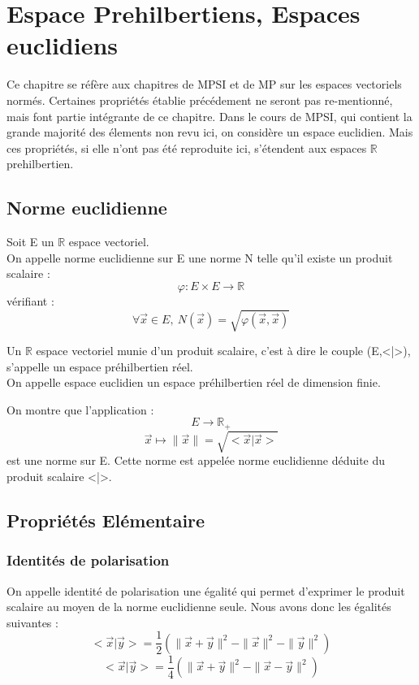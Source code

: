 \chapter{Espace Prehilbertiens, Espaces euclidiens}
Ce chapitre se réfère aux chapitres de MPSI et de MP sur les espaces vectoriels normés. Certaines propriétés établie précédement ne seront pas re-mentionné, mais font partie intégrante de ce chapitre. Dans le cours de MPSI, qui contient la grande majorité des élements non revu ici, on considère un espace euclidien. Mais ces propriétés, si elle n'ont pas été reproduite ici, s'étendent aux espaces $\mathbb{R}$ prehilbertien.
\section{Norme euclidienne}
\begin{de}
Soit E un $\mathbb{R}$ espace vectoriel.\\
On appelle norme euclidienne sur E une norme N telle qu'il existe un produit scalaire : 
$$\varphi : E\times E \rightarrow \mathbb{R}$$
vérifiant : 
$$\forall \overrightarrow{x} \in E,~ N(\overrightarrow{x}) = \sqrt{\varphi(\overrightarrow{x},\overrightarrow{x})}$$
\end{de}
\begin{de}
Un $\mathbb{R}$ espace vectoriel munie d'un produit scalaire, c'est à dire le couple (E,<|>), s'appelle un espace préhilbertien réel.\\
On appelle espace euclidien un espace préhilbertien réel de dimension finie.
\end{de}
\begin{prop}
On montre que l'application :
$$E \rightarrow \mathbb{R}_+$$
$$\overrightarrow{x} \mapsto \parallel\overrightarrow{x}\parallel = \sqrt{<\overrightarrow{x}|\overrightarrow{x}>}$$
est une norme sur E. Cette norme est appelée norme euclidienne déduite du produit scalaire <|>.
\end{prop}
\section{Propriétés Elémentaire}
\subsection{Identités de polarisation}
\begin{de}
On appelle identité de polarisation une égalité qui permet d'exprimer le produit scalaire au moyen de la norme euclidienne seule. Nous avons donc les égalités suivantes : 
$$<\overrightarrow{x}|\overrightarrow{y}> = \dfrac{1}{2}(\parallel\overrightarrow{x} + \overrightarrow{y}\parallel^2 - \parallel\overrightarrow{x}\parallel^2 - \parallel\overrightarrow{y}\parallel^2)$$
$$<\overrightarrow{x}|\overrightarrow{y}> = \dfrac{1}{4}(\parallel\overrightarrow{x} + \overrightarrow{y}\parallel^2 - \parallel\overrightarrow{x} - \overrightarrow{y}\parallel^2)$$
\end{de}
